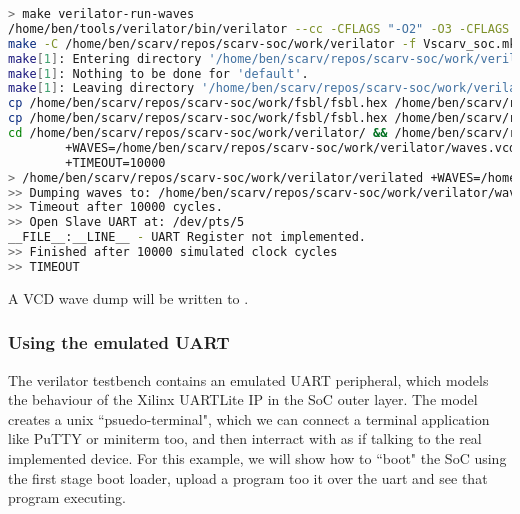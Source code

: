 \begin{itemize}
\begin{lstlisting}[language=bash,style=block]
> make verilator-run-waves
/home/ben/tools/verilator/bin/verilator --cc -CFLAGS "-O2" -O3 -CFLAGS -g -I/home/ben/scarv/repos/scarv-soc/extern/scarv-cpu/rtl/core --exe --trace --top-module scarv_soc   --Mdir /home/ben/scarv/repos/scarv-soc/work/verilator -o /home/ben/scarv/repos/scarv-soc/work/verilator/verilated -GBRAM_ROM_MEMH_FILE="\"rom.hex\"" -GBRAM_RAM_MEMH_FILE="\"ram.hex\"" -f /home/ben/scarv/repos/scarv-soc/flow/verilator/scarv-soc-rtl.manifest -f /home/ben/scarv/repos/scarv-soc/flow/verilator/scarv-soc-testbench.manifest
make -C /home/ben/scarv/repos/scarv-soc/work/verilator -f Vscarv_soc.mk
make[1]: Entering directory '/home/ben/scarv/repos/scarv-soc/work/verilator'
make[1]: Nothing to be done for 'default'.
make[1]: Leaving directory '/home/ben/scarv/repos/scarv-soc/work/verilator'
cp /home/ben/scarv/repos/scarv-soc/work/fsbl/fsbl.hex /home/ben/scarv/repos/scarv-soc/work/verilator/rom.hex
cp /home/ben/scarv/repos/scarv-soc/work/fsbl/fsbl.hex /home/ben/scarv/repos/scarv-soc/work/verilator/ram.hex
cd /home/ben/scarv/repos/scarv-soc/work/verilator/ && /home/ben/scarv/repos/scarv-soc/work/verilator/verilated  \
        +WAVES=/home/ben/scarv/repos/scarv-soc/work/verilator/waves.vcd \
        +TIMEOUT=10000
> /home/ben/scarv/repos/scarv-soc/work/verilator/verilated +WAVES=/home/ben/scarv/repos/scarv-soc/work/verilator/waves.vcd +TIMEOUT=10000 
>> Dumping waves to: /home/ben/scarv/repos/scarv-soc/work/verilator/waves.vcd
>> Timeout after 10000 cycles.
>> Open Slave UART at: /dev/pts/5
__FILE__:__LINE__ - UART Register not implemented.
>> Finished after 10000 simulated clock cycles
>> TIMEOUT
\end{lstlisting}

    A VCD wave dump will be written to .

\end{itemize}

\subsubsection{Using the emulated UART}

The verilator testbench contains an emulated UART peripheral, which
models the behaviour of the Xilinx UARTLite IP in the SoC outer layer.
The model creates a unix ``psuedo-terminal", which we can connect
a terminal application like PuTTY or miniterm too, and then interract with
as if talking to the real implemented device.
For this example, we will show how to ``boot" the SoC using the first stage
boot loader, upload a program too it over the uart and see that program
executing.


